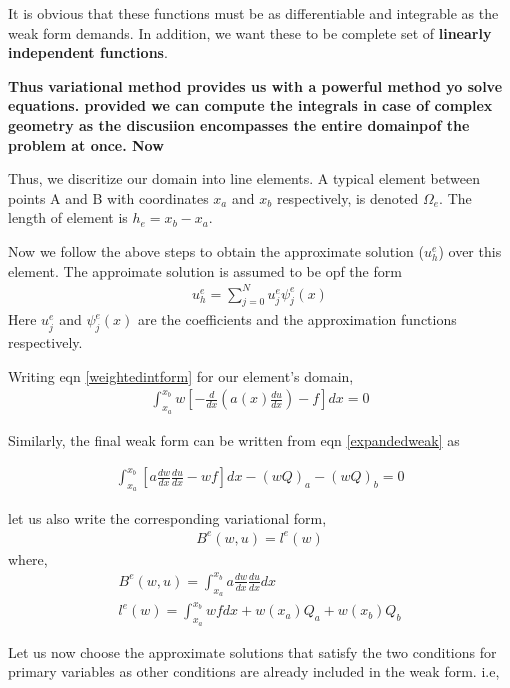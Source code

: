 It is obvious that these functions must be as differentiable and integrable as the weak form demands. In addition, we want these to be complete set of \textbf{linearly independent functions}.

\textbf{Thus variational method provides us with a powerful method yo solve equations. provided we can compute the integrals in case of complex geometry as the discusiion encompasses the entire domainpof the problem at once. Now }

Thus, we discritize our domain into line elements. A typical element between points A and B with coordinates $x_a$ and $x_b$ respectively, is denoted $\Omega_e$. The length of element is $h_e = x_b - x_a$. 

Now we follow the above steps to obtain the approximate solution ($u_h^e$) over this element.
The approimate solution is assumed to be opf the form 
\begin{eqnarray}
	u_h^e = \sum_{j = 0 }^{N} u_j^e \psi_j^e(x)
\end{eqnarray} 
Here $ u_j^e$ and $\psi_j^e(x)$ are the coefficients and the approximation functions respectively. 

Writing eqn \ref{weightedintform} for our element's domain,
\begin{eqnarray}
			\int_{x_a}^{x_b}  w \left[ -\frac{d}{dx} \left( a(x)\frac{du}{dx} \right) - f \right] dx = 0
\end{eqnarray}

Similarly, the final weak form can be written from eqn \ref{expandedweak} as 

\begin{eqnarray}
	 \int_{x_a}^{x_b} \left[ a \frac{dw}{dx} \frac{du}{dx} - wf \right] dx  -(wQ)_a  -(wQ)_b = 0
\end{eqnarray}

let us also write the corresponding variational form,
\begin{eqnarray}\label{variational}
	B^e(w,u) = l^e(w)
\end{eqnarray}
where,
\begin{eqnarray}
	B^e(w,u) = \int_{x_a}^{x_b} a \frac{dw}{dx} \frac{du}{dx} dx \\
	l^e(w) = \int_{x_a}^{x_b} wf dx + w(x_a) Q_a + w(x_b) Q_b
\end{eqnarray}


Let us now choose the approximate solutions that satisfy the two conditions for primary variables as other conditions are already included in the weak form. 
i.e,

